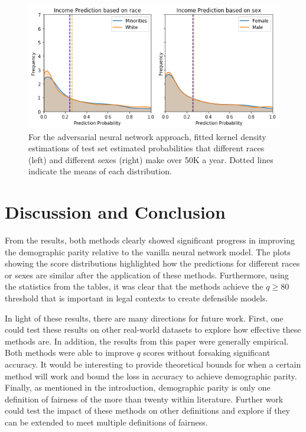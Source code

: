 \documentclass{article}
\begin{document}
\begin{figure}[ht]
	\vskip 0.2in
	\begin{center}
		\centerline{\includegraphics[width=\columnwidth]{img/adv_end.png}}
		\caption{For the adversarial neural network approach, fitted kernel density estimations of test set estimated probabilities that different races (left) and different sexes (right) make over 50K a year.  Dotted lines indicate the means of each distribution.}
		\label{adv-bias}
	\end{center}
	\vskip -0.1in
\end{figure}

\section{Discussion and Conclusion}
From the results, both methods clearly showed significant progress in improving the demographic parity relative to the vanilla neural network model. The plots showing the score distributions highlighted how the predictions for different races or sexes are similar after the application of these methods. Furthermore, using the statistics from the tables, it was clear that the methods achieve the $q \geq 80$ threshold that is important in legal contexts to create defensible models.

In light of these results, there are many directions for future work. First, one could test these results on other real-world datasets to explore how effective these methods are. In addition, the results from this paper were generally empirical. Both methods were able to improve $q$ scores without forsaking significant accuracy. It would be interesting to provide theoretical bounds for when a certain method will work and bound the loss in accuracy to achieve demographic parity. Finally, as mentioned in the introduction, demographic parity is only one definition of fairness of the more than twenty within literature. Further work could test the impact of these methods on other definitions and explore if they can be extended to meet multiple definitions of fairness.



\end{document}
